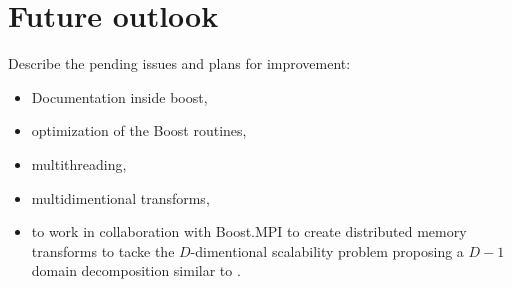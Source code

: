 \section{Future outlook}
Describe the pending issues and plans for improvement:
\begin{itemize}
    \item Documentation inside boost,
    \item optimization of the Boost routines,
    \item multithreading,
    \item multidimentional transforms,
    \item to work in collaboration with Boost.MPI to create distributed memory
    transforms to tacke the $D$-dimentional scalability problem proposing a
    $D-1$ domain decomposition similar to \cite{pippig_13}.
\end{itemize}
